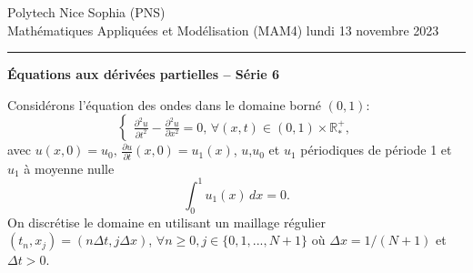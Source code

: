\documentclass[12pt,a4paper]{article}
\begin{document}
 \hfill Polytech Nice Sophia (PNS)\\
\noindent Math\'ematiques Appliqu\'ees et Mod\'elisation (MAM4)
\hfill lundi 13 novembre 2023\\

\hrule

\bigskip
\bigskip

\begin{center}{\bf \'Equations aux d\'eriv\'ees partielles --
S\'erie 6}\end{center}

\bigskip

\parskip 12pt
\noindent Consid\'erons l'\'equation des ondes dans le domaine born\'e $(0,1)$:
$$
\begin{cases}
\displaystyle\frac{\partial^2 u}{\partial t^2}-\frac{\partial^2 u}{\partial
  x^2}=0,\, \forall (x,t)\in(0,1)\times\mathbb{R}^+_*,
\end{cases}
$$
avec $u(x, 0) = u_0,\, \displaystyle\frac{\partial u}{\partial t}(x,0)=u_1(x)$,
$u$,$u_0$ et $u_1$ p\'eriodiques de p\'eriode 1 et $u_1$ \`a moyenne nulle
$$
\int_0^1 u_1(x)\,dx =0.
$$
On discr\'etise le domaine en utilisant un maillage r\'egulier
$(t_n,x_j)=(n\Delta t,j\Delta x)$,  $\forall n\ge 0,
j\in\{0,1,...,N+1\}$ o\`u $\Delta x=1/(N+1)$ et $\Delta t>0$.\\
\end{document}
